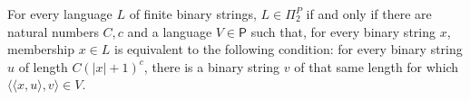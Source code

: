 \begin{theorem}
\label{Complexity.mem_PiP_two_iff_forall_exists}
\leanok
{}
For every language $L$ of finite binary strings, $L\in\Pi_2^P$ if and only if there are
natural numbers $C,c$ and a language $V\in\mathsf{P}$ such that, for every binary string
$x$, membership $x\in L$ is equivalent to the following condition: for every binary
string $u$ of length $C(|x|+1)^c$, there is a binary string $v$ of that same length for
which $\langle\langle x,u\rangle,v\rangle\in V$.
\end{theorem}

